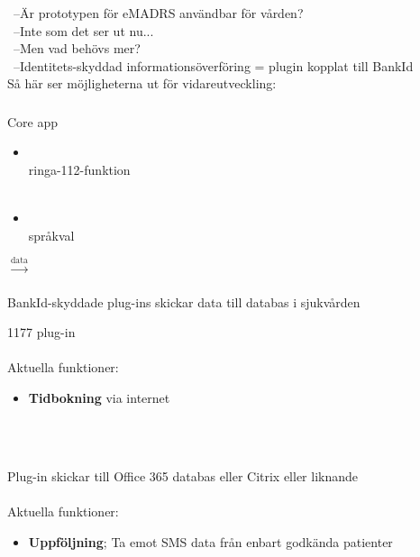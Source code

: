 \documentclass[english]{beamer}
\begin{document}
\begin{frame}
\ --Är prototypen för eMADRS användbar för vården?\\
\ --Inte som det ser ut nu...\\
\ --Men vad behövs mer?\\
\pause
\ --Identitets-skyddad informationsöverföring = plugin kopplat till BankId\\
Så här ser möjligheterna ut för vidareutveckling:
\end{frame}

\begin{frame}
\frametitle{}
{\small
\parbox{0.35\textwidth}{
Core app\\
\colorbox{black!20}{\parbox{0.35\textwidth}{
	\begin{itemize}
	\item  {
		\\
		} ringa-112-funktion\\\ 
	\item	{
		\\
		} språkval
	\end{itemize}
}}}\hspace{1em}$\xrightarrow[]{\text{data}}$\hspace{1em}\parbox{0.5\textwidth}{
BankId-skyddade plug-ins skickar data till databas i sjukvården\\
\colorbox{black!20}{\parbox{0.5\textwidth}{
	1177 plug-in\\\ \\
	Aktuella funktioner:
	\begin{itemize}
		\item {\bf Tidbokning} via internet
	\end{itemize}
}}\\\ \\
\colorbox{black!20}{\parbox{0.5\textwidth}{
	Plug-in skickar till Office 365 databas eller Citrix eller liknande\\\ \\
	Aktuella funktioner:
	\begin{itemize}
		\item {\bf Uppföljning}; Ta emot SMS data från enbart godkända patienter
	\end{itemize}
}}}}\\

\end{frame}
\end{document}
